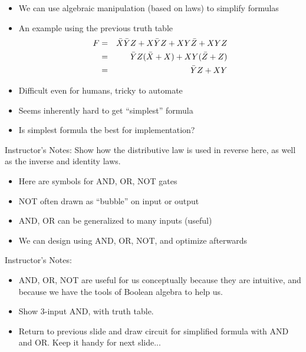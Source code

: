 \begin{frame}[fragile]
\begin{itemize}
\item We can use algebraic manipulation (based on laws) to simplify formulas
\item An example using the previous truth table
		\begin{eqnarray*} F &=& \Bar{X}\Bar{Y}Z + X\Bar{Y}Z +
                                  XY\Bar{Z} + XYZ \\
				&=& \Bar{Y}Z (\Bar{X}+X) +
				  XY(\Bar{Z}+Z)\\
				&=& \Bar{Y}Z + XY
		\end{eqnarray*}
\item Difficult even for humans, tricky to automate
\item Seems inherently hard to get ``simplest'' formula
\item Is simplest formula the best for implementation?
\end{itemize}
\BNotes\ifnum{}
Instructor's Notes:
Show how the distributive law is used in reverse here, as well as the
inverse and identity laws.
\fi\ENotes
\end{frame}

\begin{frame}[fragile]
\begin{itemize}
	\item Here are symbols for AND, OR, NOT gates
	\item NOT often drawn as ``bubble'' on input or output
	\item AND, OR can be generalized to many inputs (useful)
	\item We can design using AND, OR, NOT, and optimize afterwards
\end{itemize}
\BNotes\ifnum{}
Instructor's Notes:
\begin{itemize}
\item
AND, OR, NOT are useful for us conceptually because they are
intuitive, and because we have the tools of Boolean algebra to help
us.
\item Show 3-input AND, with truth table.
\item Return to previous slide and draw circuit for simplified formula
  with AND and OR.  Keep it handy for next slide...
\end{itemize}
\fi\ENotes
\end{frame}

